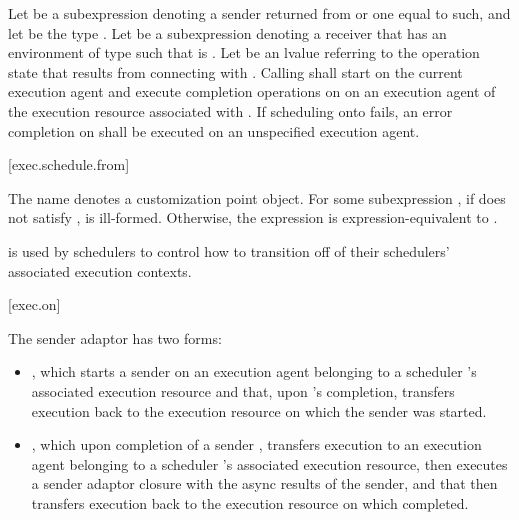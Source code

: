 \pnum
Let  be a subexpression denoting
a sender returned from  or one equal to such,
and let  be the type .
Let  be a subexpression denoting a receiver
that has an environment of type 
such that  is .
Let  be an lvalue referring to the operation state
that results from connecting  with .
Calling  shall
start  on the current execution agent and
execute completion operations on 
on an execution agent of the execution resource associated with .
If scheduling onto  fails,
an error completion on  shall be executed
on an unspecified execution agent.

[exec.schedule.from]{}

\pnum
The name  denotes a customization point object.
For some subexpression ,
if  does not satisfy ,
 is ill-formed.
Otherwise,
the expression  is expression-equivalent to
.
\begin{note}
 is used by schedulers to control
how to transition off of their schedulers' associated execution contexts.
\end{note}

[exec.on]{}

\pnum
The  sender adaptor has two forms:
\begin{itemize}
\item
{},
which starts a sender  on an execution agent
belonging to a scheduler 's associated execution resource and
that, upon 's completion,
transfers execution back to the execution resource
on which the  sender was started.
\item
{},
which upon completion of a sender ,
transfers execution to an execution agent
belonging to a scheduler 's associated execution resource,
then executes a sender adaptor closure 
with the async results of the sender, and
that then transfers execution back to the execution resource
on which  completed.
\end{itemize}

